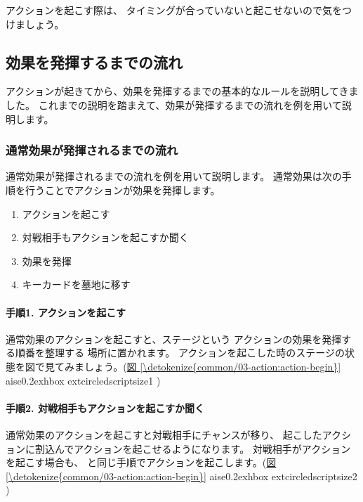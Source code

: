 \documentclass[letterpaper,10pt,dvipdfmx]{sphinxmanual}
\begin{document}
アクションを起こす際は、
タイミングが合っていないと起こせないので気をつけましょう。


\subsection{効果を発揮するまでの流れ}
\label{\detokenize{common/03-action:action-flow}}\label{\detokenize{common/03-action:id25}}
アクションが起きてから、効果を発揮するまでの基本的なルールを説明してきました。
これまでの説明を踏まえて、効果が発揮するまでの流れを例を用いて説明します。


\subsubsection{通常効果が発揮されるまでの流れ}
\label{\detokenize{common/03-action:id26}}
通常効果が発揮されるまでの流れを例を用いて説明します。
通常効果は次の手順を行うことでアクションが効果を発揮します。
\begin{enumerate}
%
\item {} 
アクションを起こす

\item {} 
対戦相手もアクションを起こすか聞く

\item {} 
効果を発揮

\item {} 
キーカードを墓地に移す

\end{enumerate}


\paragraph{手順1. アクションを起こす}
\label{\detokenize{common/03-action:id27}}
通常効果のアクションを起こすと、ステージという
アクションの効果を発揮する順番を整理する
場所に置かれます。
アクションを起こした時のステージの状態を図で見てみましょう。(\hyperref[\detokenize{common/03-action:action-begin}]{図 \ref{\detokenize{common/03-action:action-begin}}} 
aise0.2exhbox{	extcircled{scriptsize{1}}} )


\paragraph{手順2. 対戦相手もアクションを起こすか聞く}
\label{\detokenize{common/03-action:id28}}
通常効果のアクションを起こすと対戦相手にチャンスが移り、
起こしたアクションに割込んでアクションを起こせるようになります。
対戦相手がアクションを起こす場合も、 {\hyperref[\detokenize{common/03-action:action-howto}]{}} と同じ手順でアクションを起こします。(\hyperref[\detokenize{common/03-action:action-begin}]{図 \ref{\detokenize{common/03-action:action-begin}}} 
aise0.2exhbox{	extcircled{scriptsize{2}}} )
\end{document}
